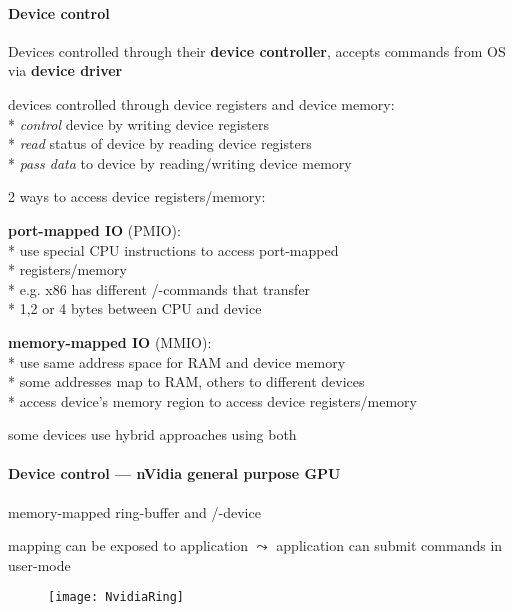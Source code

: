 \paragraph{Device control}
\begin{items}
	\item Devices controlled through their \textbf{device controller}, accepts commands from OS via \textbf{device driver}
	\item devices controlled through device registers and device memory: \\*
		\emph{control} device by writing device registers \\*
		\emph{read} status of device by reading device registers \\*
		\emph{pass data} to device by reading/writing device memory
	\item 2 ways to access device registers/memory:
	\begin{enumeration}
		\item \textbf{port-mapped IO} (PMIO): \\*
			use special CPU instructions to access port-mapped \\* \phantom{x} registers/memory \\*
			e.g. x86 has different /-commands that transfer \\* \phantom{x} 1,2 or 4 bytes between CPU and device
		\item \textbf{memory-mapped IO} (MMIO): \\*
			use same address space for RAM and device memory \\*
			some addresses map to RAM, others to different devices \\*
			access device's memory region to access device registers/memory
	\end{enumeration}
	\item some devices use hybrid approaches using both
\end{items}

\paragraph{Device control --- nVidia general purpose GPU}
\begin{items}
	\item memory-mapped ring-buffer and /-device
	\item mapping can be exposed to application \( \leadsto \) application can submit commands in user-mode
	\begin{figure}[H]\centering\label{NvidiaRing}\texttt{[image: NvidiaRing]}\end{figure}
\end{items}

